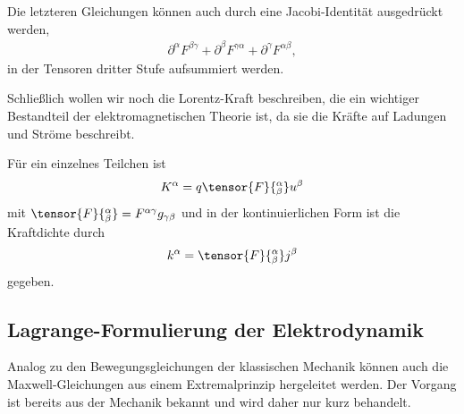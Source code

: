 Die letzteren Gleichungen können auch durch eine Jacobi-Identität ausgedrückt werden,
\begin{align*}
    \partial^\alpha F^{\beta\gamma} + \partial^\beta F^{\gamma\alpha} + \partial^\gamma F^{\alpha\beta},
\end{align*}
in der Tensoren dritter Stufe aufsummiert werden.

Schließlich wollen wir noch die Lorentz-Kraft beschreiben, die ein wichtiger Bestandteil der elektromagnetischen Theorie ist, da sie die Kräfte auf Ladungen und Ströme beschreibt.

Für ein einzelnes Teilchen ist
\begin{align*}
    K^\alpha =q \tensor{F}{^\alpha_\beta} u^\beta
\end{align*}
mit $\tensor{F}{^\alpha_\beta} = F^{\alpha\gamma} g_{\gamma\beta}$ und in der kontinuierlichen Form ist die Kraftdichte durch
\begin{align*}
    k^\alpha = \tensor{F}{^\alpha_\beta} j^\beta
\end{align*}
gegeben.


\subsection{Lagrange-Formulierung der Elektrodynamik}

Analog zu den Bewegungsgleichungen der klassischen Mechanik können auch die Maxwell-Gleichungen aus einem Extremalprinzip hergeleitet werden.
Der Vorgang ist bereits aus der Mechanik bekannt und wird daher nur kurz behandelt.

